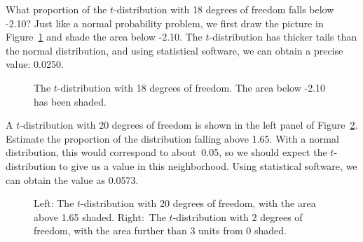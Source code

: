 \begin{examplewrap}
\begin{nexample}{What proportion of the $t$-distribution
    with 18 degrees of freedom falls below -2.10?}
  Just like a normal probability problem, we first draw
  the picture in Figure~\ref{tDistDF18LeftTail2Point10}
  and shade the area below -2.10.
  The $t$-distribution has thicker tails than the
  normal distribution,
  and using statistical software, we can obtain a precise
  value: 0.0250.
\end{nexample}
\end{examplewrap}

\begin{figure}
  \centering
  \caption{The $t$-distribution with 18 degrees of freedom.
      The area below -2.10 has been shaded.}
  \label{tDistDF18LeftTail2Point10}
\end{figure}

\begin{examplewrap}
\begin{nexample}{A $t$-distribution with 20 degrees of freedom
    is shown in the left panel of
    Figure~\ref{tDistDF20RightTail1Point65}.
    Estimate the proportion of the distribution falling
    above 1.65.}
  With a normal distribution, this would correspond to
  about~0.05, so we should expect the $t$-distribution
  to give us a value in this neighborhood.
  Using statistical software, we can obtain the value
  as 0.0573.
\end{nexample}
\end{examplewrap}

\begin{figure}
  \centering
  \caption{Left: The $t$-distribution with 20 degrees
      of freedom, with the area above 1.65 shaded.
      Right:~The $t$-distribution with 2 degrees of freedom,
      with the area further than 3 units from 0 shaded.}
  \label{tDistDF20RightTail1Point65}
\end{figure}

